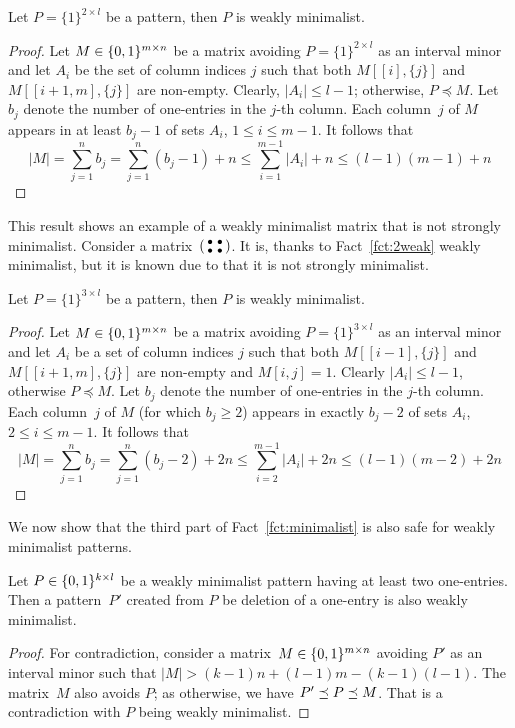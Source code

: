 \begin{fct}
\label{fct:2weak}
Let $P=\{1\}^{2\times l}$ be a pattern, then $P$ is weakly minimalist.
\end{fct}
\begin{proof}
Let $M\in\{0,1\}^{m\times n}$ be a matrix avoiding $P=\{1\}^{2\times l}$ as an interval minor and let $A_i$ be the set of column indices $j$ such that both $M[[i],\{j\}]$ and $M[[i+1,m],\{j\}]$ are non-empty. Clearly, $|A_i|\leq l-1$; otherwise, $P\preceq M$. Let $b_j$ denote the number of one-entries in the $j$-th column. Each column~$j$ of $M$ appears in at least $b_j-1$ of sets $A_i$, $1\leq i\leq m-1$. It follows that
$$|M|=\sum\limits_{j=1}^nb_j=\sum\limits_{j=1}^n(b_j-1)+n\leq\sum\limits_{i=1}^{m-1}|A_i|+n\leq(l-1)(m-1)+n$$
\end{proof}

This result shows an example of a weakly minimalist matrix that is not strongly minimalist. Consider a matrix~$\left(\begin{smallmatrix}\bullet&\bullet\\\bullet&\bullet\end{smallmatrix}\right)$. It is, thanks to Fact~\ref{fct:2weak} weakly minimalist, but it is known due to \cite{p33} that it is not strongly minimalist.

\begin{fct}
\label{fct:3weak}
Let $P=\{1\}^{3\times l}$ be a pattern, then $P$ is weakly minimalist.
\end{fct}
\begin{proof}
Let $M\in\{0,1\}^{m\times n}$ be a matrix avoiding $P=\{1\}^{3\times l}$ as an interval minor and let $A_i$ be a set of column indices $j$ such that both $M[[i-1],\{j\}]$ and $M[[i+1,m],\{j\}]$ are non-empty and $M[i,j]=1$. Clearly $|A_i|\leq l-1$, otherwise $P\preceq M$. Let $b_j$ denote the number of one-entries in the $j$-th column. Each column~$j$ of $M$ (for which $b_j\geq2$) appears in exactly $b_j-2$ of sets $A_i$, $2\leq i\leq m-1$. It follows that
$$|M|=\sum\limits_{j=1}^nb_j=\sum\limits_{j=1}^n(b_j-2)+2n\leq\sum\limits_{i=2}^{m-1}|A_i|+2n\leq(l-1)(m-2)+2n$$
\end{proof}

We now show that the third part of Fact~\ref{fct:minimalist} is also safe for weakly minimalist patterns.

\begin{lemma}
Let $P\in\{0,1\}^{k\times l}$ be a weakly minimalist pattern having at least two one-entries. Then a pattern~$P'$ created from $P$ be deletion of a one-entry is also weakly minimalist.
\end{lemma}
\begin{proof}
For contradiction, consider a matrix~$M\in\{0,1\}^{m\times n}$ avoiding $P'$ as an interval minor such that $|M|>(k-1)n+(l-1)m-(k-1)(l-1)$. The matrix~$M$ also avoids $P$; as otherwise, we have $P'\preceq P\preceq M$. That is a contradiction with $P$ being weakly minimalist. 
\end{proof}

